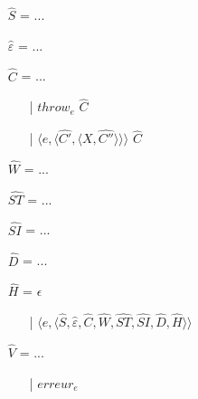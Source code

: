 \documentclass[10pt,a4paper]{article}
\begin{document}
				\begin{itemize}
					\item[] $\widehat{S}$ = ... 
					\item[] $\widehat{\varepsilon}$ = ... 
					\item[] $\widehat{C}$ = ...
					\begin{itemize}
						\item[|] $throw_{e} $ $\widehat{C}$
						\item[|] $\langle e,\langle\widehat{C'},\langle X,\widehat{C''}\rangle\rangle\rangle$ $\widehat{C}$ 
					\end{itemize}
					\item[] $\widehat{W}$ = ...
					\item[] $\widehat{ST}$ = ...
					\item[] $\widehat{SI}$ = ...
					\item[] $\widehat{D}$ = ...
					\item[] $\widehat{H}$ = $\epsilon$ 
					\begin{itemize}
						\item[|] $\langle e,\langle\widehat{S},\widehat{\varepsilon},\widehat{C},\widehat{W},\widehat{ST},\widehat{SI},\widehat{D},\widehat{H}\rangle\rangle$ 
					\end{itemize}
					\item[] $\widehat{V}$ = ... 
					\begin{itemize}
						\item[|] $erreur_{e}$
					\end{itemize}
				\end{itemize}
				\bigbreak
				\bigbreak
				
\end{document}
